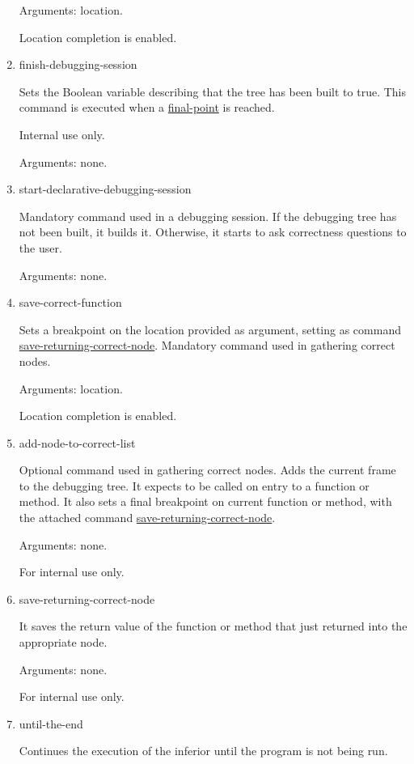 \begin{enumerate}
Arguments: location.

Location completion is enabled.
\item finish-debugging-session
\label{command:finish-debugging-session}

Sets the Boolean variable describing that the tree has been built to true.
This command is executed when a \hyperref[command:final-point]{final-point} is reached.

Internal use only.

Arguments: none.
\item start-declarative-debugging-session
\label{command:start-declarative-debugging-session}

Mandatory command used in a debugging session.
If the debugging tree has not been built, it builds it. Otherwise, it starts to ask correctness questions to the user.

Arguments: none.
\item save-correct-function
\label{command:save-correct-function}

Sets a breakpoint on the location provided as argument, setting as command \hyperref[command:save-returning-correct-node]{save-returning-correct-node}. Mandatory command used in gathering correct nodes.

Arguments: location.

Location completion is enabled.
\item add-node-to-correct-list
\label{command:add-node-to-correct-list}

Optional command used in gathering correct nodes.
Adds the current frame to the debugging tree.
It expects to be called on entry to a function or method.
It also sets a final breakpoint on current function or method, with the attached command \hyperref[command:save-returning-correct-node]{save-returning-correct-node}.

Arguments: none.

For internal use only.
\item save-returning-correct-node
\label{command:save-returning-correct-node}

It saves the return value of the function or method that just returned into the appropriate node.

Arguments: none.

For internal use only.
\item until-the-end
\label{command:until-the-end}

Continues the execution of the inferior until the program is not being run.


\end{enumerate}
